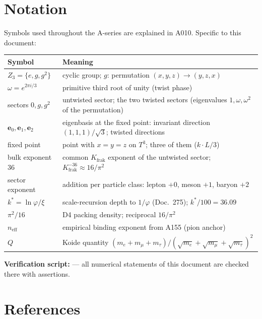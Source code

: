\section{Notation}

Symbols used throughout the A-series are explained in A010.
Specific to this document:

\begin{center}
\renewcommand{\arraystretch}{1.3}
{\small\begin{tabular}{lp{9cm}}
\toprule
Symbol & Meaning \\
\midrule
$Z_3=\{e,g,g^2\}$ & cyclic group; $g$: permutation $(x,y,z)\to(y,z,x)$ \\
$\omega=e^{2\pi i/3}$ & primitive third root of unity (twist phase) \\
sectors $0,g,g^2$ & untwisted sector; the two twisted sectors
(eigenvalues $1,\omega,\omega^2$ of the permutation) \\
$\mathbf{e}_0,\mathbf{e}_1,\mathbf{e}_2$ & eigenbasis at the fixed
point: invariant direction $(1,1,1)/\sqrt3$; twisted directions \\
fixed point & point with $x=y=z$ on $T^3$; three of them ($k\cdot L/3$) \\
bulk exponent 36 & common $K_\text{frak}$ exponent of the untwisted
sector; $K_\text{frak}^{-36}\approx 16/\pi^2$ \\
sector exponent & addition per particle class: lepton $+0$, meson
$+1$, baryon $+2$ \\
$k^*=\ln\varphi/\xi$ & scale-recursion depth to $1/\varphi$
(Doc.~275); $k^*/100=36{.}09$ \\
$\pi^2/16$ & D4 packing density; reciprocal $16/\pi^2$ \\
$n_\text{eff}$ & empirical binding exponent from A155 (pion anchor) \\
$Q$ & Koide quantity
$(m_e{+}m_\mu{+}m_\tau)/(\sqrt{m_e}{+}\sqrt{m_\mu}{+}\sqrt{m_\tau})^2$ \\
\bottomrule
\end{tabular}}
\renewcommand{\arraystretch}{1.0}
\end{center}

\medskip\noindent\textbf{Verification script:} 
--- all numerical statements of this document are checked there with assertions.

\section{References}

